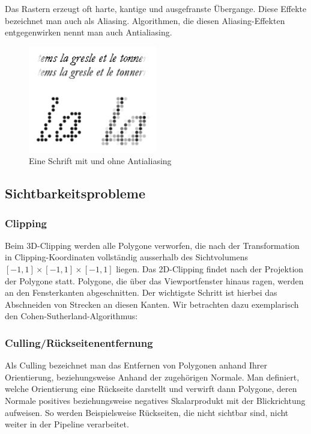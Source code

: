 Das Rastern erzeugt oft harte, kantige und ausgefranste Übergange. Diese Effekte bezeichnet man auch als Aliasing. Algorithmen, die diesen Aliasing-Effekten entgegenwirken nennt man auch 
Antialiasing. 
\begin{figure}[H]
    \centering
    \includegraphics[width=0.5\textwidth]{images/Antialiasing.png}
    \caption{Eine Schrift mit und ohne Antialiasing}
    \label{fig:screening-antialiasing-font}
\end{figure}


\subsection*{Sichtbarkeitsprobleme}

\subsubsection*{Clipping}
Beim 3D-Clipping werden alle Polygone verworfen, die nach der Transformation in Clipping-Koordinaten vollständig ausserhalb des Sichtvolumens
$[-1,1] \times [-1,1] \times [-1,1] $ liegen. Das 2D-Clipping findet nach der Projektion der Polygone statt. Polygone, die über das Viewportfenster hinaus ragen, werden an den Fensterkanten abgeschnitten.
Der wichtigste Schritt ist hierbei das Abschneiden von Strecken an diesen Kanten. Wir betrachten dazu exemplarisch den Cohen-Sutherland-Algorithmus:

\begin{Algorithmus}
\end{Algorithmus}

\subsubsection*{Culling/Rückseitenentfernung}
Als Culling bezeichnet man das Entfernen von Polygonen anhand Ihrer Orientierung, beziehungsweise Anhand der zugehörigen Normale. Man definiert, welche Orientierung eine Rückseite darstellt und verwirft dann Polygone, deren Normale positives beziehungsweise negatives Skalarprodukt mit der Blickrichtung aufweisen. So werden Beispielsweise Rückseiten, die nicht sichtbar sind, nicht weiter in der Pipeline verarbeitet.

